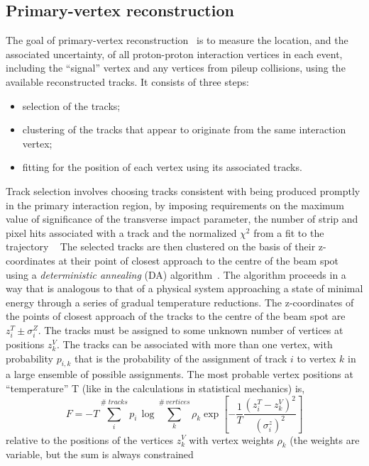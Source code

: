 \subsection*{Primary-vertex reconstruction}
The goal of primary-vertex reconstruction~\cite{Speer:927395}  is to measure the location, and the associated
uncertainty, of all proton-proton interaction vertices in each event, including the ``signal'' vertex
and any vertices from pileup collisions, using the available reconstructed tracks.  
It consists of three steps: 
\begin{itemize} 
\item  selection of the tracks;
\item clustering of the tracks that appear to originate from the same interaction vertex;
\item fitting for the position of each vertex using its associated tracks.
\end{itemize}
Track selection involves choosing tracks consistent with being produced promptly in the primary interaction region, by imposing requirements on the maximum value of significance of the transverse impact parameter,  the number of strip and pixel hits associated with a track and the normalized
$\chi^2$ from a fit to the trajectory  ~\cite{Chatrchyan:2014fea}
The selected tracks are then clustered on the basis of their z-coordinates at their point of closest approach to the centre of the beam spot  using a
\textit{deterministic annealing} (DA) algorithm~\cite{726788}. 
The algorithm proceeds in a way that is analogous to that of a physical system approaching a state of minimal energy through a series of
gradual  temperature  reductions. 
The z-coordinates  of  the  points  of  closest  approach  of  the tracks to the centre of the beam spot are $z_i^T \pm \sigma_i^Z$.
 The tracks must be assigned to some unknown number of vertices at positions $z_k^V$.
The tracks can be associated with more than one vertex, with probability $p_{i,k}$ that is  the probability of the
assignment of track $i$ to vertex $k$ in a large ensemble of possible assignments.
 The most probable vertex positions at ``temperature'' T (like in the calculations in statistical mechanics) is,
\begin{equation}
F=-T \sum_{i}^{\# \; tracks} p_i \, \log \sum_{k}^{\# \, vertices} \rho_k  \exp [-\frac{1}{T} \frac{(z_i^T-z_k^V)^2}{(\sigma_i^z)^2}  ]
\end{equation}
 relative to the positions of the vertices $z_k^V$ with vertex weights $\rho_k$ (the weights are variable, but the sum is always constrained
